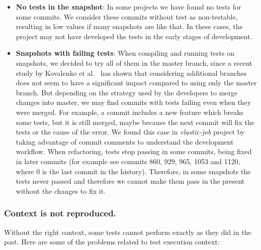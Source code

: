 \begin{itemize}
    \item  \textbf{No tests in the snapshot}: 
    In some projects we have found no tests for some commits. 
    We consider these commits without test as non-testable, resulting in low values if many snapshots are like that.
    In these cases, the project may not have developed the tests in the early stages of development.
    \item \textbf{Snapshots with failing tests}: 
    When compiling and running tests on snapshots, we decided to try all of them in the master branch, since a recent study by Kovalenko et al.~\cite{kovalenko:2018:miningfilehistories} has shown that considering additional branches does not seem to have a significant impact compared to using only the master branch. 
    But depending on the strategy used by the developers to merge changes into master, we may find commits with tests failing even when they were merged. 
    For example, a commit includes a new feature which breaks some tests, but it is still merged, maybe because the next commit will fix the tests or the cause of the error.
    We found this case in \textit{elastic-job} project by taking advantage of commit comments to understand the development workflow. 
    When refactoring, tests stop passing in some commits, being fixed in later commits (for example see commits 860, 929, 965, 1053 and 1120, where 0 is the last commit in the history).
    Therefore, in some snapshots the tests never passed and therefore we cannot make them pass in the present without the changes to fix it.
\end{itemize}

\subsubsection{Context is not reproduced.} 
Without the right context, some tests cannot perform exactly as they did in the past. Here are some of the problems related to test execution context:

